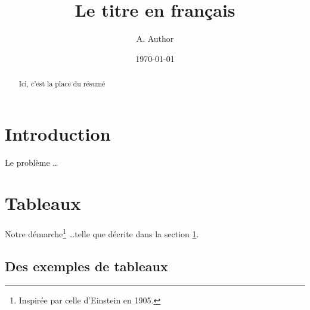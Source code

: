 \documentclass[a4paper, french]{article}
\title{Le titre en français}
\author{A. Author}
\date{\today}
\begin{document}

\maketitle

\begin{abstract}
Ici, c'est la place du résumé
\end{abstract}

\section{Introduction}
\label{sec:intro}

Le problème \ldots

\section{Tableaux}
\label{sec:tableaux}

Notre démarche\footnote{Inspirée par celle d'Einstein en 1905.} \ldots telle que décrite dans la section \ref{sec:intro}.

\subsection{Des exemples de tableaux}
\end{document}
